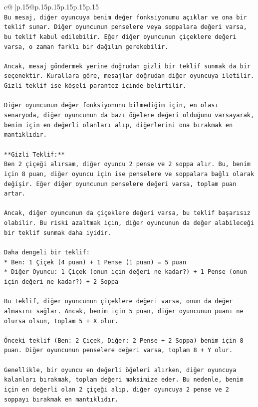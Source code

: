 \documentclass{article}
\begin{document}
{\begin{supertabular}{c@{$\;$}|p{.15\linewidth}@{}p{.15\linewidth}p{.15\linewidth}p{.15\linewidth}p{.15\linewidth}p{.15\linewidth}}
{{{\\ 
\texttt{Bu mesaj, diğer oyuncuya benim değer fonksiyonumu açıklar ve ona bir teklif sunar. Diğer oyuncunun penselere veya soppalara değeri varsa, bu teklif kabul edilebilir. Eğer diğer oyuncunun çiçeklere değeri varsa, o zaman farklı bir dağılım gerekebilir.} \\
\\ 
\texttt{Ancak, mesaj göndermek yerine doğrudan gizli bir teklif sunmak da bir seçenektir. Kurallara göre, mesajlar doğrudan diğer oyuncuya iletilir. Gizli teklif ise köşeli parantez içinde belirtilir.} \\
\\ 
\texttt{Diğer oyuncunun değer fonksiyonunu bilmediğim için, en olası senaryoda, diğer oyuncunun da bazı öğelere değeri olduğunu varsayarak, benim için en değerli olanları alıp, diğerlerini ona bırakmak en mantıklıdır.} \\
\\ 
\texttt{**Gizli Teklif:**} \\
\texttt{Ben 2 çiçeği alırsam, diğer oyuncu 2 pense ve 2 soppa alır. Bu, benim için 8 puan, diğer oyuncu için ise penselere ve soppalara bağlı olarak değişir. Eğer diğer oyuncunun penselere değeri varsa, toplam puan artar.} \\
\\ 
\texttt{Ancak, diğer oyuncunun da çiçeklere değeri varsa, bu teklif başarısız olabilir. Bu riski azaltmak için, diğer oyuncunun da değer alabileceği bir teklif sunmak daha iyidir.} \\
\\ 
\texttt{Daha dengeli bir teklif:} \\
\texttt{*   Ben: 1 Çiçek (4 puan) + 1 Pense (1 puan) = 5 puan} \\
\texttt{*   Diğer Oyuncu: 1 Çiçek (onun için değeri ne kadar?) + 1 Pense (onun için değeri ne kadar?) + 2 Soppa} \\
\\ 
\texttt{Bu teklif, diğer oyuncunun çiçeklere değeri varsa, onun da değer almasını sağlar. Ancak, benim için 5 puan, diğer oyuncunun puanı ne olursa olsun, toplam 5 + X olur.} \\
\\ 
\texttt{Önceki teklif (Ben: 2 Çiçek, Diğer: 2 Pense + 2 Soppa) benim için 8 puan. Diğer oyuncunun penselere değeri varsa, toplam 8 + Y olur.} \\
\\ 
\texttt{Genellikle, bir oyuncu en değerli öğeleri alırken, diğer oyuncuya kalanları bırakmak, toplam değeri maksimize eder. Bu nedenle, benim için en değerli olan 2 çiçeği alıp, diğer oyuncuya 2 pense ve 2 soppayı bırakmak en mantıklıdır.} \\
}}}
\end{supertabular}}
\end{document}
